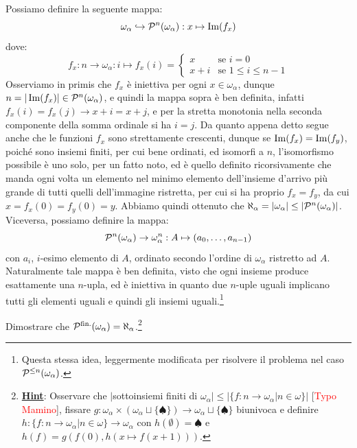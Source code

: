 \begin{soln}
	Possiamo definire la seguente mappa:
	\[ \omega_\alpha \hookrightarrow \mathcal{P}^n(\omega_\alpha) : x \mapsto \operatorname{Im}(f_x)
		\]
	dove:
	\[ f_x : n \to \omega_\alpha : i \mapsto f_x(i) = \begin{cases}
		x &\text{se $i = 0$} \\
		x + i &\text{se $1 \leq i \leq n - 1$}
	\end{cases}
		\]
	Osserviamo in primis che $f_x$ \`e iniettiva per ogni $x \in \omega_\alpha$, dunque $n = |\operatorname{Im}(f_x)| \in \mathcal{P}^n(\omega_\alpha)$, e quindi la mappa sopra \`e ben definita, infatti $f_x(i) = f_x(j) \to x + i = x + j$,
	e per la stretta monotonia nella seconda componente della somma ordinale si ha $i = j$. Da quanto appena detto segue anche che le funzioni $f_x$ sono strettamente crescenti,
	dunque se $\operatorname{Im}(f_x) = \operatorname{Im}(f_y)$, poich\'e sono insiemi finiti, per cui bene ordinati, ed isomorfi a $n$, l'isomorfismo possibile \`e uno solo, per un fatto noto, ed \`e quello definito ricorsivamente che manda ogni volta un elemento 
	nel minimo elemento dell'insieme d'arrivo pi\`u grande di tutti quelli dell'immagine ristretta, per cui si ha proprio $f_x = f_y$, da cui $x = f_x(0) = f_y(0) = y$. Abbiamo quindi ottenuto che $\aleph_\alpha = |\omega_\alpha| \leq |\mathcal{P}^n(\omega_\alpha)|$.\\
	Viceversa, possiamo definire la mappa:
	\[ \mathcal{P}^n(\omega_\alpha) \to \omega_\alpha^n : A \mapsto (a_0,\ldots,a_{n-1})
		\]
	con $a_i$, $i$-esimo elemento di $A$, ordinato secondo l'ordine di $\omega_\alpha$ ristretto ad $A$. Naturalmente tale mappa \`e ben definita, visto che ogni insieme produce esattamente una $n$-upla, ed \`e iniettiva in quanto due $n$-uple uguali implicano tutti
	gli elementi uguali e quindi gli insiemi uguali.\footnote{Questa stessa idea, leggermente modificata per risolvere il problema nel caso $\mathcal{P}^{\leq n}(\omega_\alpha)$.}
\end{soln}

\begin{exercise}
	Dimostrare che $\mathcal{P}^{\text{fin.}}(\omega_\alpha) = \aleph_\alpha$.\footnote{\textbf{\underline{Hint}}: Osservare che $|$sottoinsiemi finiti di $\omega_\alpha| \leq |\{f : n \to \omega_\alpha | n \in \omega\}|$ [\textcolor{red}{Typo Mamino}], fissare $g : \omega_\alpha \times (\omega_\alpha \sqcup \{\spadesuit\}) \to \omega_\alpha \sqcup \{\spadesuit\}$ biunivoca e definire
	$h : \{f : n \to \omega_\alpha | n \in \omega\} \to \omega_\alpha$ con $h(\emptyset) = \spadesuit$ e $h(f) = g(f(0),h(x \mapsto f(x+1)))$.}
\end{exercise}

